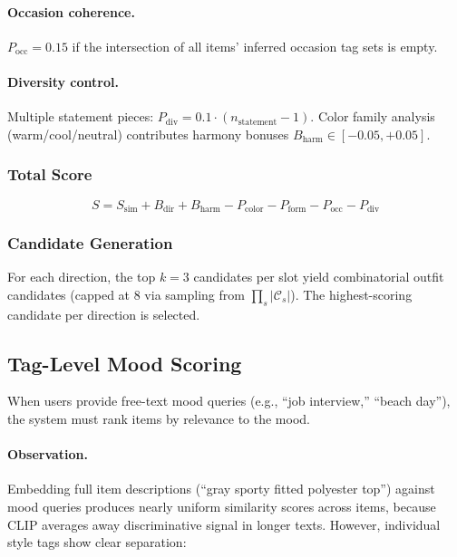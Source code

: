 \documentclass[10pt,twocolumn]{article}
\begin{document}
\paragraph{Occasion coherence.}
$P_{\text{occ}} = 0.15$ if the intersection of all items' inferred occasion
tag sets is empty.

\paragraph{Diversity control.}
Multiple statement pieces: $P_{\text{div}} = 0.1 \cdot
(n_{\text{statement}} - 1)$.  Color family analysis (warm/cool/neutral)
contributes harmony bonuses $B_{\text{harm}} \in [-0.05, +0.05]$.

\subsubsection{Total Score}

\begin{equation}
  S = S_{\text{sim}} + B_{\text{dir}} + B_{\text{harm}}
    - P_{\text{color}} - P_{\text{form}} - P_{\text{occ}} - P_{\text{div}}
\label{eq:total}
\end{equation}

\subsubsection{Candidate Generation}

For each direction, the top $k{=}3$ candidates per slot yield combinatorial
outfit candidates (capped at 8 via sampling from
$\prod_{s} |\mathcal{C}_s|$).  The highest-scoring candidate per direction
is selected.

\subsection{Tag-Level Mood Scoring}
\label{sec:tag_mood}

When users provide free-text mood queries (e.g., ``job interview,'' ``beach
day''), the system must rank items by relevance to the mood.

\paragraph{Observation.}
Embedding full item descriptions (``gray sporty fitted polyester top'')
against mood queries produces nearly uniform similarity scores across items,
because CLIP averages away discriminative signal in longer texts.  However,
individual style tags show clear separation:
\end{document}
